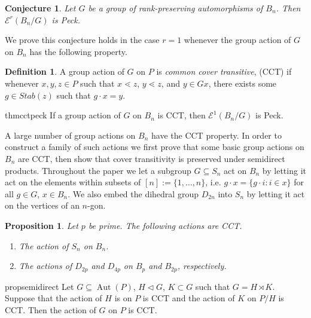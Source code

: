 \documentclass[10 pt]{amsart}
\theoremstyle{plain}
\newtheorem{prop}[thm]{Proposition}
\newtheorem{conjecture}[thm]{Conjecture}
\theoremstyle{definition}
\newtheorem{defn}[thm]{Definition}
\theoremstyle{remark}
\numberwithin{equation}{section}
\begin{document}
\begin{conjecture}\label{conj:F_of_BnG_Peck}
Let $G$ be a group of rank-preserving automorphisms of $B_n$.  Then $\mathcal E^r(B_n/G)$ is Peck.
\end{conjecture}

We prove this conjecture holds in the case $r=1$ whenever the group action of $G$ on $B_n$ has the following property.

\begin{defn}
\label{defn:cover_transitive}
A group action of $G$ on $P$ is \textit{common cover transitive}, (CCT) if whenever $x,y,z\in P$ such that $x\lessdot z$, $y\lessdot z$, and $y\in Gx$, there exists some $g\in Stab(z)$ such that $g\cdot x = y.$
\end{defn}

\begin{restatable}{thm}{cctpeck}
\label{thm:cover_transitive_implies_Peck}
If a group action of $G$ on $B_n$ is CCT, then $\mathcal E^1(B_n/G)$ is Peck.
\end{restatable}

A large number of group actions on $B_n$ have the CCT property.  In order to construct a family of such actions we first prove that some basic group actions on $B_n$ are CCT, then show that cover transitivity is preserved under semidirect products.  Throughout the paper we let a subgroup $G\subseteq S_n$ act on $B_n$ by letting it act on the elements within subsets of $[n]:= \{1,\ldots, n\}$, i.e. $g\cdot x = \{g\cdot i\colon i\in x\}$  for all $g\in G$, $x\in B_n$.  We also embed the dihedral group $D_{2n}$ into $S_n$ by letting it act on the vertices of an $n$-gon.

\begin{prop}\label{prop:cover_transitive_building_blocks}
Let $p$ be prime.  The following actions are CCT.

\begin{enumerate}
\item The action of $S_n$ on $B_n$.
\item The actions of $D_{2p}$ and $D_{4p}$ on $B_p$ and $B_{2p}$, respectively.
\end{enumerate}
\end{prop}

\begin{restatable}{prop}{semidirect}
\label{prop:semidirect_product_preservation}
Let $G\subseteq \operatorname{Aut}(P)$, $H\triangleleft G$, $K\subset G$ such that $G = H\rtimes K$.  Suppose that the action of $H$ is on $P$ is CCT and the action of $K$ on $P/H$ is CCT. Then the action of $G$ on $P$ is CCT.
\end{restatable}
\end{document}
